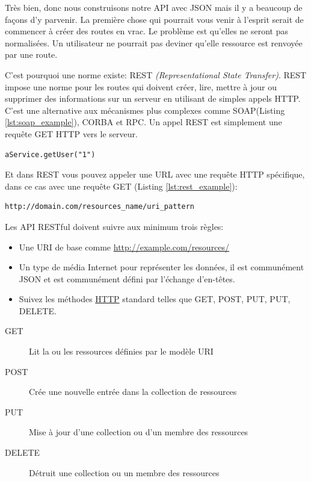 \documentclass[]{report}
\begin{document}
    Très bien, donc nous construisons notre API avec JSON mais il y a beaucoup de façons d'y parvenir. La première chose qui pourrait vous venir à l'esprit serait de commencer à créer des routes en vrac. Le problème est qu'elles ne seront pas normalisées. Un utilisateur ne pourrait pas deviner qu'elle ressource est renvoyée par une route.

    C'est pourquoi une norme existe: REST \textit{(Representational State Transfer)}. REST impose une norme pour les routes qui doivent créer, lire, mettre à jour ou supprimer des informations sur un serveur en utilisant de simples appels HTTP. C'est une alternative aux mécanismes plus complexes comme SOAP(Listing \ref{lst:soap_example}), CORBA et RPC. Un appel REST est simplement une requête GET HTTP vers le serveur.

    \begin{scriptsize}
    \begin{lstlisting}[label={lst:soap_example}, caption={Un exemple d'appel SOAP}]
    aService.getUser("1")
    \end{lstlisting}
    \end{scriptsize}

    Et dans REST vous pouvez appeler une URL avec une requête HTTP spécifique, dans ce cas avec une requête GET (Listing \ref{lst:rest_example}):

    \begin{scriptsize}
    \begin{lstlisting}[label={lst:rest_example}, caption={Un exemple d'appel REST}]
    http://domain.com/resources_name/uri_pattern
    \end{lstlisting}
    \end{scriptsize}

    Les API RESTful doivent suivre aux minimum trois règles:

    \begin{itemize}
      \item Une URI de base comme \href{http://example.com/resources/}{http://example.com/resources/}
      \item Un type de média Internet pour représenter les données, il est communément JSON et est communément défini par l'échange d'en-têtes.
      \item Suivez les méthodes \href{https://fr.wikipedia.org/wiki/Hypertext_Transfer_Protocol}{HTTP} standard telles que GET, POST, PUT, PUT, DELETE.
    \end{itemize}

    \begin{description}
      \item[GET] Lit la ou les ressources définies par le modèle URI
      \item[POST] Crée une nouvelle entrée dans la collection de ressources
      \item[PUT] Mise à jour d'une collection ou d'un membre des ressources
      \item[DELETE] Détruit une collection ou un membre des ressources
    \end{description}
\end{document}
